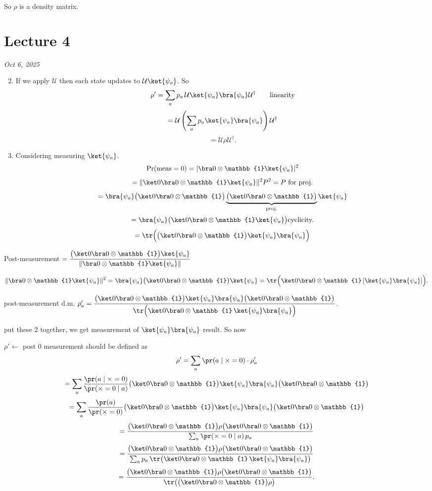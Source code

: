 \documentclass[11pt]{article}
\begin{document}
So $\rho$ is a density matrix.

\section{Lecture 4}
\textit{Oct 6, 2025}

\begin{enumerate}
\setcounter{enumi}{1}
\item[\textcircled{2}] If we apply $\mathcal{U}$ then each state updates to $\mathcal{U}\ket{\psi_a}$. So
\[
\rho' = \sum_a p_a\,\mathcal{U}\ket{\psi_a}\bra{\psi_a}\mathcal{U}^\dagger \qquad \text{linearity}
\]
\[
= \mathcal{U}\left(\sum_a p_a\ket{\psi_a}\bra{\psi_a}\right)\mathcal{U}^\dagger
\]
\[
= \mathcal{U}\rho\mathcal{U}^\dagger.
\]
\item[\textcircled{3}] Considering measuring $\ket{\psi_a}$.
\[
\Pr(\text{meas}=0) = |\bra0\otimes\mathbb{1}\ket{\psi_a}|^2
\]
\[
= \|\ket0\bra0\otimes\mathbb{1}\ket{\psi_a}\|^2 \hfill P^2=P \text{ for proj.}
\]
\[
= \bra{\psi_a}\big(\ket0\bra0\otimes\mathbb{1}\big)\underbrace{\big(\ket0\bra0\otimes\mathbb{1}\big)}_{\text{proj.}}\ket{\psi_a}
\]
\[
= \bra{\psi_a}\big(\ket0\bra0\otimes\mathbb{1}\ket{\psi_a}\big) \hfill \text{cyclicity.}
\]
\[
= \tr\Big(\big(\ket0\bra0\otimes\mathbb{1}\big)\ket{\psi_a}\bra{\psi_a}\Big)
\]
\end{enumerate}
Post-measurement \quad $= \dfrac{\big(\ket0\bra0\otimes\mathbb{1}\big)\ket{\psi_a}}{\|\bra0\otimes\mathbb{1}\ket{\psi_a}\|}$

\[
\|\bra0\otimes\mathbb{1}\ket{\psi_a}\|^2 = \bra{\psi_a}\big(\ket0\bra0\otimes\mathbb{1}\big)\ket{\psi_a} = \tr\Big(\ket0\bra0\otimes\mathbb{1}\,[\ket{\psi_a}\bra{\psi_a}]\Big).
\]

post-measurement d.m. \quad $\rho_a' = \dfrac{\big(\ket0\bra0\otimes\mathbb{1}\big)\ket{\psi_a}\bra{\psi_a}\big(\ket0\bra0\otimes\mathbb{1}\big)}{\tr\Big(\ket0\bra0\otimes\mathbb{1}\,\ket{\psi_a}\bra{\psi_a}\Big)}$.

put these 2 together, we get measurement of $\ket{\psi_a}\bra{\psi_a}$ result. So now

$\rho' \leftarrow$ post 0 measurement should be defined as
\[
\rho' = \sum_a \pr(a\mid\times=0)\cdot\rho_a'
\]
\[
= \sum_a \frac{\pr(a\mid\times=0)}{\pr(\times=0\mid a)} \big(\ket0\bra0\otimes\mathbb{1}\big)\ket{\psi_a}\bra{\psi_a}\big(\ket0\bra0\otimes\mathbb{1}\big)
\]
\[
= \sum_a \frac{\pr(a)}{\pr(\times=0)} \big(\ket0\bra0\otimes\mathbb{1}\big)\ket{\psi_a}\bra{\psi_a}\big(\ket0\bra0\otimes\mathbb{1}\big)
\]
\[
= \frac{\big(\ket0\bra0\otimes\mathbb{1}\big)\rho\big(\ket0\bra0\otimes\mathbb{1}\big)}{\sum_a \pr(\times=0\mid a)\,p_a}
\]
\[
= \frac{\big(\ket0\bra0\otimes\mathbb{1}\big)\rho\big(\ket0\bra0\otimes\mathbb{1}\big)}{\sum_a p_a\,\tr\big(\ket0\bra0\otimes\mathbb{1}\,\ket{\psi_a}\bra{\psi_a}\big)}
\]
\[
= \frac{\big(\ket0\bra0\otimes\mathbb{1}\big)\rho\big(\ket0\bra0\otimes\mathbb{1}\big)}{\tr\big(\big(\ket0\bra0\otimes\mathbb{1}\big)\rho\big)}.
\]
\end{document}
